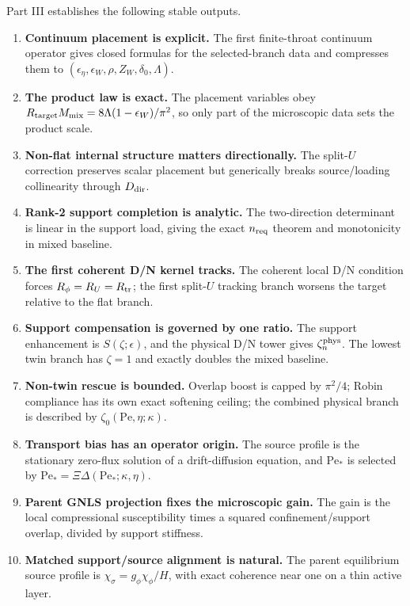 Part III establishes the following stable outputs.
\begin{enumerate}[leftmargin=2.2em]
  \item \textbf{Continuum placement is explicit.}  The first finite-throat continuum operator gives closed formulas for the selected-branch data and compresses them to \((\epsilon_\eta,\epsilon_W,\rho,Z_W,\delta_0,\Lambda)\).
  \item \textbf{The product law is exact.}  The placement variables obey \(R_{\rm target}M_{\rm mix}=8\Lambda(1-\epsilon_W)/\pi^2\), so only part of the microscopic data sets the product scale.
  \item \textbf{Non-flat internal structure matters directionally.}  The split-\(U\) correction preserves scalar placement but generically breaks source/loading collinearity through \(D_{\rm dir}\).
  \item \textbf{Rank-2 support completion is analytic.}  The two-direction determinant is linear in the support load, giving the exact \(n_{\rm req}\) theorem and monotonicity in mixed baseline.
  \item \textbf{The first coherent D/N kernel tracks.}  The coherent local D/N condition forces \(R_\phi=R_U=R_{\rm tr}\); the first split-\(U\) tracking branch worsens the target relative to the flat branch.
  \item \textbf{Support compensation is governed by one ratio.}  The support enhancement is \(S(\zeta;\epsilon)\), and the physical D/N tower gives \(\zeta_n^{\rm phys}\).  The lowest twin branch has \(\zeta=1\) and exactly doubles the mixed baseline.
  \item \textbf{Non-twin rescue is bounded.}  Overlap boost is capped by \(\pi^2/4\); Robin compliance has its own exact softening ceiling; the combined physical branch is described by \(\zeta_0(\mathrm{Pe},\eta;\kappa)\).
  \item \textbf{Transport bias has an operator origin.}  The source profile is the stationary zero-flux solution of a drift-diffusion equation, and \(\mathrm{Pe}_*\) is selected by \(\mathrm{Pe}_*=\Xi\Delta(\mathrm{Pe}_*;\kappa,\eta)\).
  \item \textbf{Parent GNLS projection fixes the microscopic gain.}  The gain is the local compressional susceptibility times a squared confinement/support overlap, divided by support stiffness.
  \item \textbf{Matched support/source alignment is natural.}  The parent equilibrium source profile is \(\chi_\sigma=g_\phi\chi_\phi/H\), with exact coherence near one on a thin active layer.

\end{enumerate}
